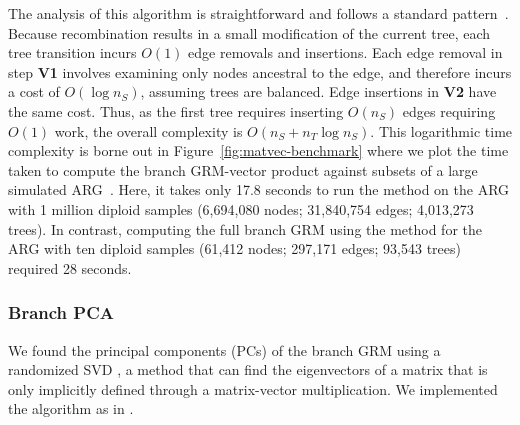 The analysis of this algorithm is straightforward and follows a standard 
pattern~\citep{kelleher2016efficient,ralph2020efficiently}. Because
recombination results in a small modification of the current tree,
each tree transition
incurs $O(1)$ edge removals and insertions. Each edge removal in step \textbf{V1}
involves examining only nodes ancestral to the edge, and therefore incurs
a cost of $O(\log{n_S})$, assuming trees are balanced. Edge insertions
in \textbf{V2} have the same cost. Thus, 
as the first tree requires inserting $O(n_S)$ edges requiring $O(1)$
work, the overall complexity is $O(n_S + n_T \log{n_S})$.
This logarithmic time complexity is borne out in
Figure~\ref{fig:matvec-benchmark} where we plot the time taken to compute the 
branch GRM-vector product against subsets of a large simulated
ARG~\citep{andersontrocme2023genes}. Here, it takes only
17.8 seconds to run the \tsGRMv{} method 
on the ARG with 1 million diploid samples
(6,694,080 nodes; 31,840,754 edges; 4,013,273 trees).
In contrast, computing the full branch
GRM using the \tsGRM{} method 
for the ARG with ten diploid samples
(61,412 nodes;  297,171 edges; 93,543 trees) required 28 seconds.


\subsubsection{Branch PCA}

We found the principal components (PCs) of the branch GRM
using a randomized SVD \citep{halko2011findingstructure},
a method that can find the
eigenvectors of a matrix that is only implicitly defined through a matrix-vector multiplication.
We implemented the algorithm as \tsPCA{} in \tskit{}.

